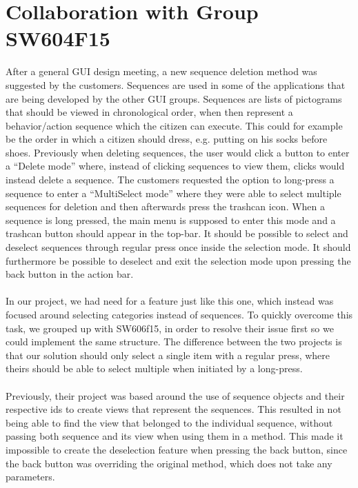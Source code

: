 \section{Collaboration with Group SW604F15}
\label{sec:collaboration_with_group_sw604f15}


After a general GUI design meeting, a new sequence deletion method was suggested by the customers. Sequences are used in some of the applications that are being developed by the other GUI groups. Sequences are lists of pictograms that should be viewed in chronological order, when then represent a behavior/action sequence which the citizen can execute. This could for example be the order in which a citizen should dress, e.g. putting on his socks before shoes. Previously when deleting sequences, the user would click a button to enter a ``Delete mode'' where, instead of clicking sequences to view them, clicks would instead delete a sequence. The customers requested the option to long-press a sequence to enter a ``MultiSelect mode'' where they were able to select multiple sequences for deletion and then afterwards press the trashcan icon. When a sequence is long pressed, the main menu is supposed to enter this mode and a trashcan button should appear in the top-bar. It should be possible to select and deselect sequences through regular press once inside the selection mode. It should furthermore be possible to deselect and exit the selection mode upon pressing the back button in the action bar.
\\\\
In our project, we had need for a feature just like this one, which instead was focused around selecting categories instead of sequences. To quickly overcome this task, we grouped up with SW606f15, in order to resolve their issue first so we could implement the same structure. The difference between the two projects is that our solution should only select a single item with a regular press, where theirs should be able to select multiple when initiated by a long-press.
\\\\
Previously, their project was based around the use of sequence objects and their respective ids to create views that represent the sequences. This resulted in not being able to find the view that belonged to the individual sequence, without passing both sequence and its view when using them in a method. This made it impossible to create the deselection feature when pressing the back button, since the back button was overriding the original  method, which does not take any parameters.
